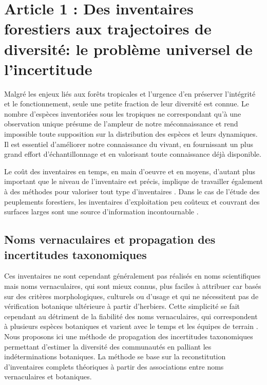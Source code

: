 \documentclass[
  11pt,
  french,
  A4paper,
  extrafontsizes,onecolumn,openright
  ]{memoir}
\begin{document}
\chapter{Article 1 : Des inventaires forestiers aux trajectoires de
diversité: le problème universel de
l'incertitude}\label{article-1-des-inventaires-forestiers-aux-trajectoires-de-diversite-le-probleme-universel-de-lincertitude}

Malgré les enjeux liés aux forêts tropicales et l'urgence d'en préserver
l'intégrité et le fonctionnement, seule une petite fraction de leur
diversité est connue. Le nombre d'espèces inventoriées sous les
tropiques ne correspondant qu'à une observation unique
\autocite{Feeley2011} présume de l'ampleur de notre méconnaissance et
rend impossible toute supposition sur la distribution des espèces et
leurs dynamiques. Il est essentiel d'améliorer notre connaissance du
vivant, en fournissant un plus grand effort d'échantillonnage et en
valorisant toute connaissance déjà disponible.

Le coût des inventaires en temps, en main d'oeuvre et en moyens,
d'autant plus important que le niveau de l'inventaire est précis,
implique de travailler également à des méthodes pour valoriser tout type
d'inventaires \autocite{Baraloto2012}. Dans le cas de l'étude des
peuplements forestiers, les inventaires d'exploitation peu coûteux et
couvrant des surfaces larges sont une source d'information
incontournable \autocites{terSteege2000}{Guitet2014}.

\section{Noms vernaculaires et propagation des incertitudes
taxonomiques}\label{noms-vernaculaires-et-propagation-des-incertitudes-taxonomiques}

Ces inventaires ne sont cependant généralement pas réalisés en noms
scientifiques mais noms vernaculaires, qui sont mieux connus, plus
faciles à attribuer car basés sur des critères morphologiques, culturels
ou d'usage et qui ne nécessitent pas de vérification botanique
ultérieure à partir d'herbiers. Cette simplicité se fait cependant au
détriment de la fiabilité des noms vernaculaires, qui correspondent à
plusieurs espèces botaniques et varient avec le temps et les équipes de
terrain \autocite{Oldeman1968}. Nous proposons ici une méthode de
propagation des incertitudes taxonomiques permettant d'estimer la
diversité des communautés en palliant les indéterminations botaniques.
La méthode se base sur la reconstitution d'inventaires complets
théoriques à partir des associations entre noms vernaculaires et
botaniques.
\end{document}
